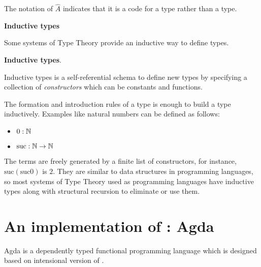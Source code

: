 The notation of $\hat{A}$ indicates that it is a code for a type rather than a type.


\textbf{Inductive types}

Some systems of Type Theory provide an inductive way to define types.

\begin{definition}\label{df:inductivetypes}
\textbf{Inductive types}.

Inductive types is a self-referential schema to define new types by specifying a collection of \emph{constructors} which can be constants and functions.
\end{definition}

The formation and introduction rules of a type is enough to build a type inductively. Examples like
natural numbers can be defined as follows:

\begin{itemize}
\item $0 : \mathbb{N}$
\item $\text{suc} : \mathbb{N} \rightarrow \mathbb{N}$
\end{itemize}

The terms are freely generated by a finite list of constructors, for instance, $\text{suc} (\text{suc} 0)$ is $2$. They are similar to data structures in programming languages, so most systems of Type Theory used as programming languages have inductive types along with structural recursion to eliminate or use them.

\section{An implementation of \mltt: Agda}

Agda is a dependently typed functional programming language which is designed based on intensional version
of \mltt \cite{agdawiki:main}. 

